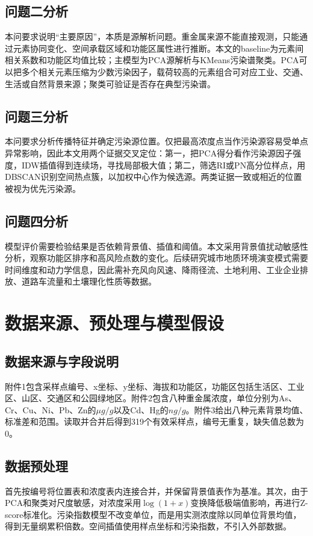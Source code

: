 \documentclass[UTF8,a4paper,12pt]{ctexart}
\begin{document}
\subsection{问题二分析}
本问要求说明“主要原因”，本质是源解析问题。重金属来源不能直接观测，只能通过元素协同变化、空间承载区域和功能区属性进行推断。本文的baseline为元素间相关系数和功能区均值比较；主模型为PCA源解析与KMeans污染谱聚类。PCA可以把多个相关元素压缩为少数污染因子，载荷较高的元素组合可对应工业、交通、生活或自然背景来源；聚类可验证是否存在典型污染谱。

\subsection{问题三分析}
本问要求分析传播特征并确定污染源位置。仅把最高浓度点当作污染源容易受单点异常影响，因此本文用两个证据交叉定位：第一，把PCA得分看作污染源因子强度，IDW插值得到连续场，寻找局部极大值；第二，筛选RI或PN高分位样点，用DBSCAN识别空间热点簇，以加权中心作为候选源。两类证据一致或相近的位置被视为优先污染源。

\subsection{问题四分析}
模型评价需要检验结果是否依赖背景值、插值和阈值。本文采用背景值扰动敏感性分析，观察功能区排序和高风险点数的变化。后续研究城市地质环境演变模式需要时间维度和动力学信息，因此需补充风向风速、降雨径流、土地利用、工业企业排放、道路车流量和土壤理化性质等数据。

\section{数据来源、预处理与模型假设}
\subsection{数据来源与字段说明}
附件1包含采样点编号、x坐标、y坐标、海拔和功能区，功能区包括生活区、工业区、山区、交通区和公园绿地区。附件2包含八种重金属浓度，单位分别为As、Cr、Cu、Ni、Pb、Zn的$\mu g/g$以及Cd、Hg的$ng/g$。附件3给出八种元素背景均值、标准差和范围。读取并合并后得到319个有效采样点，编号无重复，缺失值总数为0。

\subsection{数据预处理}
首先按编号将位置表和浓度表内连接合并，并保留背景值表作为基准。其次，由于PCA和聚类对尺度敏感，对浓度采用$\log(1+x)$变换降低极端值影响，再进行Z-score标准化。污染指数模型不改变单位，而是用实测浓度除以同单位背景均值，得到无量纲累积倍数。空间插值使用样点坐标和污染指数，不引入外部数据。
\end{document}
